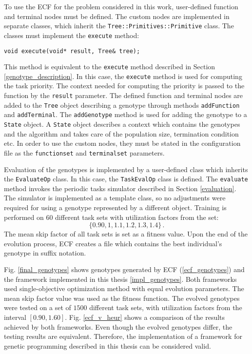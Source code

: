 To use the ECF for the problem considered in this work, user-defined function and terminal nodes must be defined.
The custom nodes are implemented in separate classes, which inherit the \texttt{Tree::Primitives::Primitive} class.
The classes must implement the \texttt{execute} method:
\begin{lstlisting}[frame=none, label={exec}, caption={A prototype of the \texttt{execute} method.}, captionpos=b]
    void execute(void* result, Tree& tree);
\end{lstlisting}
This method is equivalent to the \texttt{execute} method described in Section \ref{genotype_description}.
In this case, the \texttt{execute} method is used for computing the task priority.
The context needed for computing the priority is passed to the function by the \texttt{result} parameter.
The defined function and terminal nodes are added to the \texttt{Tree} object  describing a genotype through methods \texttt{addFunction} and \texttt{addTerminal}.
The \texttt{addGenotype} method is used for adding the genotype to a \texttt{State} object.
A \texttt{State} object describes a context which contains the genotypes and the algorithm and takes care of the population size, termination condition etc.
In order to use the custom nodes, they must be stated in the configuration file as the \texttt{functionset} and \texttt{terminalset} parameters.

Evaluation of the genotypes is implemented by a user-defined class which inherits the \texttt{EvaluateOp} class.
In this case, the \texttt{TaskEvalOp} class is defined.
The \texttt{evaluate} method invokes the periodic tasks simulator described in Section
\ref{evaluation}.
The simulator is implemented as a template class, so no adjustments were required for using a genotype represented by a different object.
Training is performed on 60 different task sets with utilization factors from the set:
\begin{equation*}
\{ 0.90, 1, 1.1, 1.2, 1.3, 1.4 \} \, .
\end{equation*}
The mean skip factor of all task sets is set as a fitness value.
Upon the end of the evolution process, ECF creates a file which contains the best individual's genotype in suffix notation.

Fig. \ref{final_genotypes} shows genotypes generated by ECF (\ref{ecf_genotypes}) and the framework implemented in this thesis \ref{impl_genotypes}. 
Both frameworks used single-objective optimization method with equal evolution parameters.
The mean skip factor value was used as the fitness function.
The evolved genotypes were tested on a set of $1500$ different task sets, with utilization factors from the interval $[0.90, 1.60]$.
Fig. \ref{ecf_v_heur} shows a comparison of the results achieved by both frameworks.
Even though the evolved genotypes differ, the testing results are equivalent.
Therefore, the implementation of a framework for genetic programming described in this thesis can be considered valid. 

